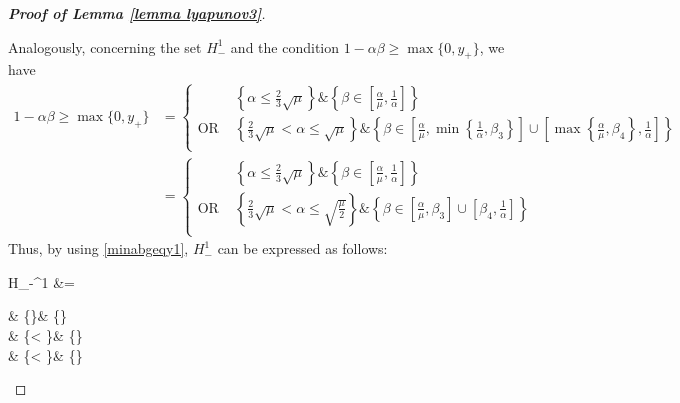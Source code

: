 \documentclass[reqno]{amsart}
\theoremstyle{plain}
\theoremstyle{definition}
\theoremstyle{remark}
\begin{document}
\begin{proof}[\textbf{Proof of Lemma \ref{lemma lyapunov3}}]
\begin{itemize}[wide=0pt]
\begin{itemize}[wide=5pt]
			
			Analogously, concerning the set $H_{-}^{1}$ and the condition $1-\alpha\beta \geq \max\{0,y_{+}\}$, we have
			\begin{equation}\label{minabgeqy1}
				\begin{aligned}
					1-\alpha\beta \geq \max\{0,y_{+}\} &= \begin{cases}
						& \left\{\alpha\leq \frac{2}{3}\sqrt{\mu}\right\}\& \left\{\beta\in \left[\frac{\alpha}{\mu},\frac{1}{\alpha}\right]\right\} \\ 
						\text{OR } & \left\{\frac{2}{3}\sqrt{\mu}<\alpha \leq \sqrt{\mu} \right\}\& \left\{\beta\in \left[\frac{\alpha}{\mu},\min\left\{\frac{1}{\alpha},\beta_{3}\right\}\right]\cup \left[\max\left\{\frac{\alpha}{\mu},\beta_{4}\right\},\frac{1}{\alpha}\right]\right\} \\
					\end{cases} \\
					&=
					\begin{cases}
						& \left\{\alpha\leq \frac{2}{3}\sqrt{\mu}\right\}\& \left\{\beta\in \left[\frac{\alpha}{\mu},\frac{1}{\alpha}\right]\right\} \\ 
						\text{OR } & \left\{\frac{2}{3}\sqrt{\mu}<\alpha \leq \sqrt{\frac{\mu}{2}} \right\}\& \left\{\beta\in \left[\frac{\alpha}{\mu},\beta_{3}\right]\cup \left[\beta_{4},\frac{1}{\alpha}\right]\right\} \\
					\end{cases}
				\end{aligned}
			\end{equation}	
			Thus, by using \eqref{minabgeqy1}, $H_{-}^{1}$ can be expressed as follows:
			\begin{flalign}\label{H1minfinal}
					H_{-}^{1} &= 
					\begin{cases}
						& \left\{\alpha\leq {}\sqrt{\mu}\right\}\& \left\{\beta\in {}\cup{}\right\} \\ 
						 & \left\{\sqrt{\mu}<\alpha \leq {} \right\}\& \left\{\beta\in {}\cup {}\right\} \\
						 & \left\{\sqrt{\mu}<\alpha \leq {} \right\}\& \left\{\beta\in {}\cup {}\right\}

\end{cases}
\end{flalign}
\end{itemize}
\end{itemize}
\end{proof}
\end{document}
